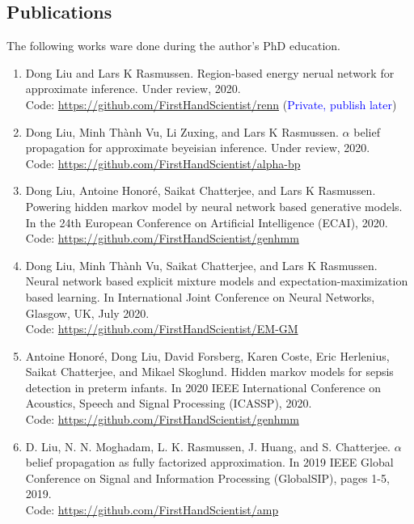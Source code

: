 \subsection{Publications}
The following works ware done during the author's PhD education.
\begin{enumerate}
\item Dong Liu and Lars K Rasmussen. Region-based energy nerual network for approximate
  inference. Under review, 2020. \\
  Code: \href{https://github.com/FirstHandScientist/renn}{https://github.com/FirstHandScientist/renn} (\textcolor{blue}{Private, publish later})
\item Dong Liu, Minh Th\`{a}nh Vu, Li Zuxing, and Lars K Rasmussen. $\alpha$ belief propagation for approximate beyeisian inference. Under review, 2020.\\
  Code: \href{https://github.com/FirstHandScientist/alpha-bp}{https://github.com/FirstHandScientist/alpha-bp}

\item Dong Liu, Antoine Honor{\'e}, Saikat Chatterjee, and Lars K Rasmussen. Powering hidden
  markov model by neural network based generative models. In the 24th European Conference on Artificial Intelligence (ECAI), 2020.\\
  Code: \href{https://github.com/FirstHandScientist/genhmm}{https://github.com/FirstHandScientist/genhmm}

\item Dong Liu, Minh Th\`{a}nh Vu, Saikat Chatterjee, and Lars K Rasmussen. Neural network based explicit mixture models and expectation-maximization based learning. In International Joint Conference on Neural Networks, Glasgow, UK, July 2020. \\
  Code: \href{https://github.com/FirstHandScientist/EM-GM}{https://github.com/FirstHandScientist/EM-GM}

\item Antoine Honor{\'e}, Dong Liu, David Forsberg, Karen Coste, Eric Herlenius, Saikat Chatterjee, and Mikael Skoglund. Hidden markov models for sepsis detection in preterm infants. In 2020 IEEE International Conference on Acoustics, Speech and Signal Processing (ICASSP), 2020.\\
  Code: \href{https://github.com/FirstHandScientist/genhmm}{https://github.com/FirstHandScientist/genhmm}

\item D. Liu, N. N. Moghadam, L. K. Rasmussen, J. Huang, and S. Chatterjee. $\alpha$ belief propagation as fully factorized approximation. In 2019 IEEE Global Conference on Signal and Information Processing (GlobalSIP), pages 1-5, 2019.\\
  Code: \href{https://github.com/FirstHandScientist/amp}{https://github.com/FirstHandScientist/amp}


\end{enumerate}
